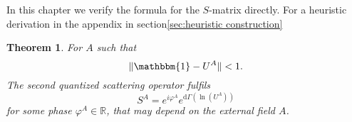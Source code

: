 \documentclass[b5paper,draft,openbib,12pt]{memoir}
\newtheorem{Thm}[Def]{Theorem}
\newcommand{\id}{\mathbbm{1}}
\begin{document}
In this chapter we verify the formula for the \(S\)-matrix directly.
For a heuristic derivation in the appendix in section\ref{sec:heuristic construction}


\begin{Thm}\label{sleek_second_quantised_scattering_operator}
For \(A\) such that 
\begin{equation}
\|\id-U^A\|<1.
\end{equation}\label{eq:sleek_scattering}
The second quantized scattering operator fulfils
\begin{equation}\label{eq:sleek_second_quantised_scattering_operator}
S^A= e^{i \varphi^A} e^{\mathrm{d}\Gamma(\ln (U^A))}
\end{equation}
for some phase \(\varphi^A\in\mathbb{R}\), that may depend on the external field \(A\).

\end{Thm}
\end{document}
